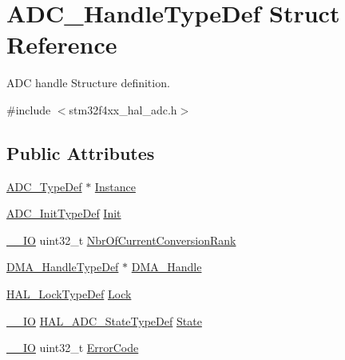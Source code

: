 \hypertarget{struct_a_d_c___handle_type_def}{}\section{A\+D\+C\+\_\+\+Handle\+Type\+Def Struct Reference}
\label{struct_a_d_c___handle_type_def}


A\+DC handle Structure definition.  




{\ttfamily \#include $<$stm32f4xx\+\_\+hal\+\_\+adc.\+h$>$}

\subsection*{Public Attributes}
\begin{DoxyCompactItemize}
\item 
\hyperlink{struct_a_d_c___type_def}{A\+D\+C\+\_\+\+Type\+Def} $\ast$ \hyperlink{struct_a_d_c___handle_type_def_a3d89e51782aec71f9cfdff63f943d785}{Instance}
\item 
\hyperlink{struct_a_d_c___init_type_def}{A\+D\+C\+\_\+\+Init\+Type\+Def} \hyperlink{struct_a_d_c___handle_type_def_a43986a9a8ff67bdb398c01db82fda605}{Init}
\item 
\hyperlink{core__sc300_8h_aec43007d9998a0a0e01faede4133d6be}{\+\_\+\+\_\+\+IO} uint32\+\_\+t \hyperlink{struct_a_d_c___handle_type_def_a434bd009117470aa394a3043fa759dc8}{Nbr\+Of\+Current\+Conversion\+Rank}
\item 
\hyperlink{group___d_m_a___exported___types_ga41b754a906b86bce54dc79938970138b}{D\+M\+A\+\_\+\+Handle\+Type\+Def} $\ast$ \hyperlink{struct_a_d_c___handle_type_def_a1983db16acacd5f0b2881e43010dcd72}{D\+M\+A\+\_\+\+Handle}
\item 
\hyperlink{stm32f4xx__hal__def_8h_ab367482e943333a1299294eadaad284b}{H\+A\+L\+\_\+\+Lock\+Type\+Def} \hyperlink{struct_a_d_c___handle_type_def_a7ef248e63b28b67cd985bafaeffd68ba}{Lock}
\item 
\hyperlink{core__sc300_8h_aec43007d9998a0a0e01faede4133d6be}{\+\_\+\+\_\+\+IO} \hyperlink{group___a_d_c___exported___types_gafd66db22d830742b403c1f7f32d4630e}{H\+A\+L\+\_\+\+A\+D\+C\+\_\+\+State\+Type\+Def} \hyperlink{struct_a_d_c___handle_type_def_a8efe107a09ecb028a8bc69192d99b84f}{State}
\item 
\hyperlink{core__sc300_8h_aec43007d9998a0a0e01faede4133d6be}{\+\_\+\+\_\+\+IO} uint32\+\_\+t \hyperlink{struct_a_d_c___handle_type_def_a576634bdfdae8c61203a232876d2ba72}{Error\+Code}
\end{DoxyCompactItemize}


